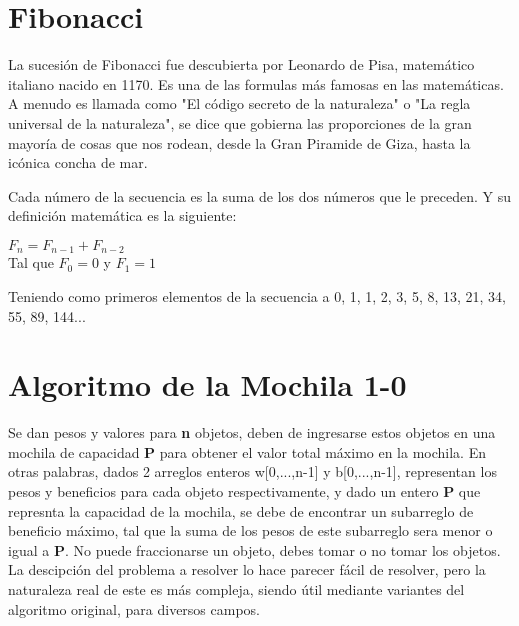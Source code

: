 \section*{Fibonacci}
    La sucesión de Fibonacci fue descubierta por Leonardo de Pisa, matemático italiano nacido en 1170. Es una de las formulas más famosas en las matemáticas. A menudo es llamada como "El código secreto de la naturaleza" o "La regla universal de la naturaleza", se dice que gobierna las proporciones de la gran mayoría de cosas que nos rodean, desde la Gran Piramide de Giza, hasta la icónica concha de mar.
    
    Cada número de la secuencia es la suma de los dos números que le preceden. Y su definición matemática es la siguiente:
    
    \begin{center}
        $F_{n}=F_{n-1}+F_{n-2}$\\
        Tal que $F_{0}=0$ y $F_{1}=1$
    \end{center}
    Teniendo como primeros elementos de la secuencia a 0, 1, 1, 2, 3, 5, 8, 13, 21, 34, 55, 89, 144...
    
    
\section*{Algoritmo de la Mochila 1-0}
    Se dan pesos y valores para \textbf{n} objetos, deben de ingresarse estos objetos en una mochila de capacidad \textbf{P} para obtener el valor total máximo en la mochila. En otras palabras, dados 2 arreglos enteros w[0,...,n-1] y b[0,...,n-1], representan los pesos y beneficios para cada objeto respectivamente, y dado un entero \textbf{P} que represnta la capacidad de la mochila, se debe de encontrar un subarreglo de beneficio máximo, tal que la suma de los pesos de este subarreglo sera menor o igual a \textbf{P}. No puede fraccionarse un objeto, debes tomar o no tomar los objetos.\\
    
    La descipción del problema a resolver lo hace parecer fácil de resolver, pero la naturaleza real de este es más compleja, siendo útil mediante variantes del algoritmo original, para diversos campos.\\
    
